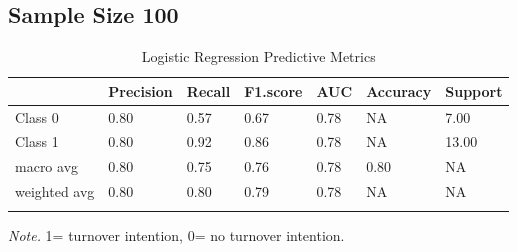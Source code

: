 \documentclass[
  man]{apa7}
\begin{document}
\hypertarget{sample-size-100}{%
\subsection{Sample Size 100}\label{sample-size-100}}

\begin{table}[tbp]

\begin{center}
\begin{threeparttable}

\caption{\label{tab:logitable200}Logistic Regression Predictive Metrics}

\begin{tabular}{lllllll}
\toprule
 & \multicolumn{1}{c}{Precision} & \multicolumn{1}{c}{Recall} & \multicolumn{1}{c}{F1.score} & \multicolumn{1}{c}{AUC} & \multicolumn{1}{c}{Accuracy} & \multicolumn{1}{c}{Support}\\
\midrule
Class 0 & 0.80 & 0.57 & 0.67 & 0.78 & NA & 7.00\\
Class 1 & 0.80 & 0.92 & 0.86 & 0.78 & NA & 13.00\\
macro avg & 0.80 & 0.75 & 0.76 & 0.78 & 0.80 & NA\\
weighted avg & 0.80 & 0.80 & 0.79 & 0.78 & NA & NA\\
\bottomrule
\addlinespace
\end{tabular}

\begin{tablenotes}[para]
\normalsize{\textit{Note.} 1= turnover intention, 0= no turnover intention.}
\end{tablenotes}

\end{threeparttable}
\end{center}

\end{table}
\end{document}
